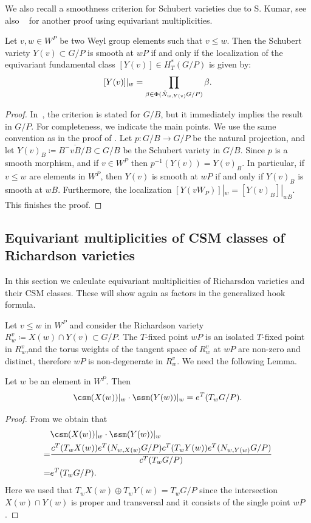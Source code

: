 We also recall a smoothness criterion for Schubert varieties due to S. Kumar, see also ~\cite[page 255 (K)]{brion:eq-chow} for another proof using equivariant multiplicities.
\begin{theorem}\label{thm:kumar} 
	Let $v,w \in W^P$ be two Weyl group elements such that $v \le w$. Then the Schubert variety 
	$Y(v)\subset G/P$ is smooth at $wP$ if and only if the localization of the 
	equivariant fundamental class $ [Y(v)]\in H_T^*(G/P)$ is given by:
	\[ [Y(v)]|_{w}= \prod_{\beta\in  \Phi(\tilde{N}_{w,Y(v)} G/P)}\beta \/.\] 
\end{theorem}
\begin{proof} In~\cite{kumar1996nil}, the criterion is stated for $G/B$, but it immediately 
	implies the result in $G/P$. For completeness, we indicate the main points. We use the same convention as in the proof of .
	Let $p:G/B \to G/P$ be the natural projection, and let $Y(v)_B\coloneqq \overline{B^-vB/B}\subset G/B$ be the Schubert variety in $G/B$. Since $p$ is a smooth morphism, and if
	$v \in W^P$ then $p^{-1}(Y(v)) = Y(v)_B$. In particular, if $v \le w$ are elements in $W^P$, 
	then $Y(v)$ is smooth at $wP$ if and only if $Y(v)_B$ is smooth at $wB$. Furthermore, 
	the localization $[Y(vW_P)]|_{w} = [Y(v)_B]|_{wB}$. This finishes the proof.
\end{proof}




\subsection{Equivariant multiplicities of CSM classes of Richardson varieties} In this section we calculate 
equivariant multiplicities of Richarsdon varieties and their CSM classes. These will show again 
as factors in the generalized hook formula.

Let $v \le w$ in $W^P$ and consider the Richardson variety $R_w^{v}\coloneqq  X(w) \cap Y(v )\subset G/P$. The $T$-fixed point $wP$ is an isolated $T$-fixed point in $R_w^v$,and the torus weights of the tangent space of $R_w^v$ at $wP$ are non-zero and distinct, therefore $wP$ is non-degenerate in $R_w^v$. We need the following Lemma. 


\begin{lemma}\label{lemma:prodloc} Let $w$ be an element in $W^P$. Then 
	\[ \csm(X(w))|_w \cdot \ssm(Y(w))|_w = e^T(T_w G/P) \/. \]
\end{lemma}
\begin{proof} From  we obtain that
	\[ \begin{split} &\csm(X(w))|_w \cdot \ssm(Y(w))|_w \\
    =&  
		\frac{c^T( T_w X(w)) e^T (N_{w,X(w)} G/P) c^T( T_w Y(w)) e^T (N_{w,Y(w)} G/P)}{c^T (T_w G/P)} \\ 
		=& e^T (T_w G/P) \/. \end{split} \] 
	Here we used that $T_w X(w) \oplus T_w Y(w) = T_w G/P$ since the intersection $X(w) \cap Y(w)$
	is proper and transversal and it consists of the single point $wP$.\end{proof}

